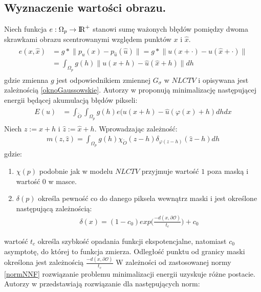 \documentclass[12pt, twoside, openany]{report}
\theoremstyle{definition}
\begin{document}
\subsection{Wyznaczenie wartości obrazu.}
Niech funkcja $e: \Omega_{p} \rightarrow {\rm I\!R}^{+}$ stanowi sumę ważonych błędów pomiędzy dwoma skrawkami obrazu scentrowanymi względem punktów $x$ i $\hat{x}$.
\begin{align}
\begin{aligned}
e(x, \hat{x}) &= g \ast \big\| p_{u}(x) - p_{\hat{u}}(\hat{u}) \big\| = g \ast \big\| u(x + \cdot) - u(\hat{x} + \cdot) \big\| \\ 
&= \int_{\Omega_{p}} g(h) \big\| u(x+h) - \hat{u}(\hat{x} +h) \big\|dh
\label{minUs}
\end{aligned}
\end{align}
gdzie zmienna $g$ jest odpowiednikiem zmiennej $G_{\sigma}$ w $NLCTV$ i opisywana jest zależnością \eqref{oknoGaussowskie}. Autorzy w \cite{arias2011variational} proponują minimalizację następującej energii będącej akumulacją błędów pikseli:
\begin{align}
\begin{aligned}
E(u) &= \int_{\widetilde O}\int_{\Omega_{p}}g(h)e(u(x+h) - \hat{u}(\varphi(x)+h)dhdx
\label{patchMatchEnergy}
\end{aligned}
\end{align} 
Niech $z := x+h$ i $\hat{z} := \hat{x}+h$. Wprowadzając zależność:
\begin{align}
m(z,\hat{z}) = \int_{\Omega_{p}}g(h)\chi_{\widetilde O}(z-h)\delta_{\varphi(z-h)}(\hat{z}-h)dh
\end{align}
gdzie:
\begin{enumerate}
\item
$\chi(p)$ podobnie jak w modelu $NLCTV$ przyjmuje wartość $1$ poza maską i wartość $0$ w masce.
\item
$\delta(p)$ określa pewność co do danego piksela wewnątrz maski i jest określone następującą zależnością:
\begin{align}
\delta(x)=(1-c_0)exp\bigg(\frac{-d(x,\partial\mathcal{O})}{t_c}\bigg) + c_0
\label{pewnoscVFI}
\end{align}
\end{enumerate}
wartość $t_c$ określa szybkość opadania funkcji ekspotencjalne, natomiast $c_0$ asymptotę, do której to funkcja zmierza. Odległość punktu od granicy maski określona jest zależnością $\frac{-d(x,\partial\mathcal{O})}{t_c}$ W zależności od zastosowanej normy \eqref{normNNF} rozwiązanie problemu minimalizacji energii uzyskuje różne postacie. Autorzy w \cite{arias2011variational} przedstawiają rozwiązanie dla następujących norm:
\end{document}
